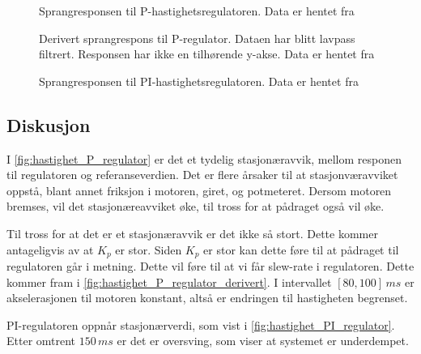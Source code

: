 
\begin{figure}[h!]
    \centering
    
    \caption{Sprangresponsen til P-hastighetsregulatoren. Data er hentet fra \cite{EksempelData}}
    \label{fig:hastighet_P_regulator}
\end{figure}

\begin{figure}[h!]
    \centering
    
    \caption{Derivert sprangrespons til P-regulator. Dataen har blitt lavpass filtrert. Responsen har ikke en tilhørende y-akse. Data er hentet fra \cite{EksempelData}}
    \label{fig:hastighet_P_regulator_derivert}
\end{figure}

\begin{figure}[h!]
    \centering
    
    \caption{Sprangresponsen til PI-hastighetsregulatoren. Data er hentet fra \cite{EksempelData}}
    \label{fig:hastighet_PI_regulator}
\end{figure}

\subsection{Diskusjon}

I \autoref{fig:hastighet_P_regulator} er det et tydelig stasjonæravvik, mellom responen til regulatoren og referanseverdien. Det er flere årsaker til at stasjonværavviket oppstå, blant annet friksjon i motoren, giret, og potmeteret. Dersom motoren bremses, vil det stasjonæreavviket øke, til tross for at pådraget også vil øke.

Til tross for at det er et stasjonæravvik er det ikke så stort. Dette kommer antageligvis av at $K_p$ er stor. Siden $K_p$ er stor kan dette føre til at pådraget til regulatoren går i metning. Dette vil føre til at vi får slew-rate i regulatoren. Dette kommer fram i \autoref{fig:hastighet_P_regulator_derivert}. I intervallet $[80, 100]\,ms$ er akselerasjonen til motoren konstant, altså er endringen til hastigheten begrenset.

PI-regulatoren oppnår stasjonærverdi, som vist i \autoref{fig:hastighet_PI_regulator}. Etter omtrent $150\,ms$ er det er oversving, som viser at systemet er underdempet.



